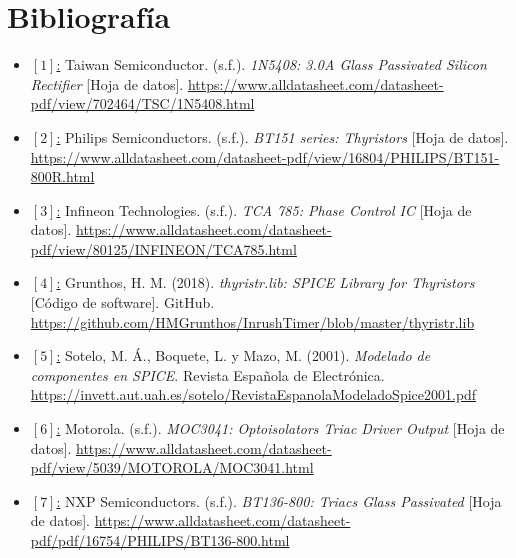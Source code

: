 \documentclass[12pt,a4paper]{article}
\begin{document}
\section{Bibliografía}
\begin{itemize}
    \raggedright
    \item \underline{$[1]$:} Taiwan Semiconductor. (s.f.). \textit{1N5408: 3.0A Glass Passivated Silicon Rectifier} [Hoja de datos]. \url{https://www.alldatasheet.com/datasheet-pdf/view/702464/TSC/1N5408.html}

    \item \underline{$[2]$:} Philips Semiconductors. (s.f.). \textit{BT151 series: Thyristors} [Hoja de datos]. \url{https://www.alldatasheet.com/datasheet-pdf/view/16804/PHILIPS/BT151-800R.html}

    \item \underline{$[3]$:} Infineon Technologies. (s.f.). \textit{TCA 785: Phase Control IC} [Hoja de datos]. \url{https://www.alldatasheet.com/datasheet-pdf/view/80125/INFINEON/TCA785.html}
    
    \item \underline{$[4]$:} Grunthos, H. M. (2018). \textit{thyristr.lib: SPICE Library for Thyristors} [Código de software]. GitHub. \url{https://github.com/HMGrunthos/InrushTimer/blob/master/thyristr.lib}
    
    \item \underline{$[5]$:} Sotelo, M. Á., Boquete, L. y Mazo, M. (2001). \textit{Modelado de componentes en SPICE}. Revista Española de Electrónica. \url{https://invett.aut.uah.es/sotelo/RevistaEspanolaModeladoSpice2001.pdf}

    \item \underline{$[6]$:} Motorola. (s.f.). \textit{MOC3041: Optoisolators Triac Driver Output} [Hoja de datos]. \url{https://www.alldatasheet.com/datasheet-pdf/view/5039/MOTOROLA/MOC3041.html}

    \item \underline{$[7]$:} NXP Semiconductors. (s.f.). \textit{BT136-800: Triacs Glass Passivated} [Hoja de datos]. \url{https://www.alldatasheet.com/datasheet-pdf/pdf/16754/PHILIPS/BT136-800.html}
    
\end{itemize}
\end{document}
